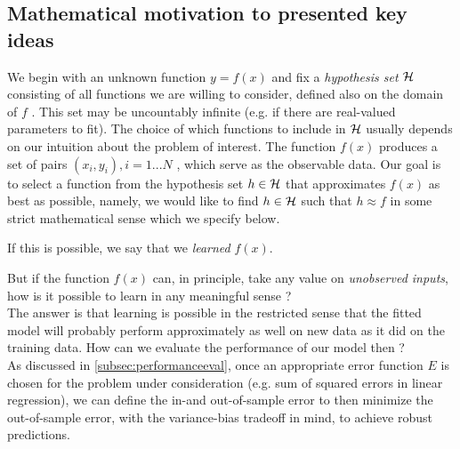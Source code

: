 \subsection{Mathematical motivation to presented key ideas}
We begin with an unknown function
$y = f (x)$ and fix a \emph{hypothesis set} $\mathcal{H}$ consisting of all functions we are willing to consider, defined also on the domain of $f$ . This set may be uncountably infinite (e.g. if
there are real-valued parameters to fit). The choice of
which functions to include in $\mathcal{H}$ usually depends on our
intuition about the problem of interest. The function
$f (x)$ produces a set of pairs $(x_i , y_i ), i = 1 . . . N$ , which
serve as the observable data. Our goal is to select a function from the hypothesis set $h \in \mathcal{H}$ that approximates
$f (x)$ as best as possible, namely, we would like to find
$h \in \mathcal{H}$ such that $h \approx f$ in some strict mathematical
sense which we specify below. 
\begin{mybox}{}
If this is possible, we say
that we \emph{learned} $f (x)$. 
\end{mybox}
But if the function $f (x)$ can, in
principle, take any value on \emph{unobserved inputs}, how is it
possible to learn in any meaningful sense ?\\
The answer is that learning is possible in the restricted
sense that the fitted model will probably perform approximately as well on new data as it did on the training data.
How can we evaluate the performance of our model then ?\\
As discussed in \ref{subsec:performanceeval}, once an appropriate error function $E$ is chosen for the
problem under consideration (e.g. sum of squared errors
in linear regression), we can define the in-and out-of-sample error to then minimize the out-of-sample error, with the variance-bias tradeoff in mind, to achieve robust predictions.
